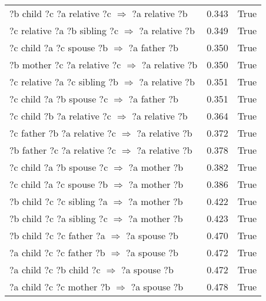\begin{longtable}{lrl}
   ?b  child  ?c  ?a  relative  ?c   $\Rightarrow$ ?a  relative  ?b &           0.343 &                     True \\
 ?c  relative  ?a  ?b  sibling  ?c   $\Rightarrow$ ?a  relative  ?b &           0.349 &                     True \\
       ?c  child  ?a  ?c  spouse  ?b   $\Rightarrow$ ?a  father  ?b &           0.350 &                     True \\
  ?b  mother  ?c  ?a  relative  ?c   $\Rightarrow$ ?a  relative  ?b &           0.350 &                     True \\
 ?c  relative  ?a  ?c  sibling  ?b   $\Rightarrow$ ?a  relative  ?b &           0.351 &                     True \\
       ?c  child  ?a  ?b  spouse  ?c   $\Rightarrow$ ?a  father  ?b &           0.351 &                     True \\
   ?c  child  ?b  ?a  relative  ?c   $\Rightarrow$ ?a  relative  ?b &           0.364 &                     True \\
  ?c  father  ?b  ?a  relative  ?c   $\Rightarrow$ ?a  relative  ?b &           0.372 &                     True \\
  ?b  father  ?c  ?a  relative  ?c   $\Rightarrow$ ?a  relative  ?b &           0.378 &                     True \\
       ?c  child  ?a  ?b  spouse  ?c   $\Rightarrow$ ?a  mother  ?b &           0.382 &                     True \\
       ?c  child  ?a  ?c  spouse  ?b   $\Rightarrow$ ?a  mother  ?b &           0.386 &                     True \\
      ?b  child  ?c  ?c  sibling  ?a   $\Rightarrow$ ?a  mother  ?b &           0.422 &                     True \\
      ?b  child  ?c  ?a  sibling  ?c   $\Rightarrow$ ?a  mother  ?b &           0.423 &                     True \\
       ?b  child  ?c  ?c  father  ?a   $\Rightarrow$ ?a  spouse  ?b &           0.470 &                     True \\
       ?a  child  ?c  ?c  father  ?b   $\Rightarrow$ ?a  spouse  ?b &           0.472 &                     True \\
        ?a  child  ?c  ?b  child  ?c   $\Rightarrow$ ?a  spouse  ?b &           0.472 &                     True \\
       ?a  child  ?c  ?c  mother  ?b   $\Rightarrow$ ?a  spouse  ?b &           0.478 &                     True \\

\end{longtable}
